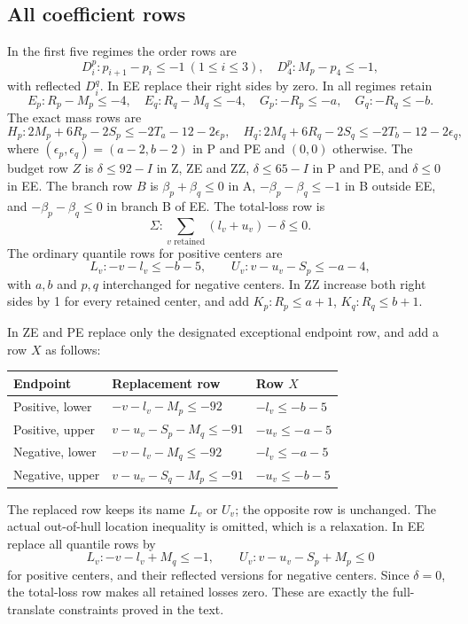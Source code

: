\documentclass[11pt,a4paper]{article}
\theoremstyle{remark}
\begin{document}
\subsection{All coefficient rows}
In the first five regimes the order rows are
\[
 D_i^p:p_{i+1}-p_i\leq-1\ (1\leq i\leq3),\quad
 D_4^p:M_p-p_4\leq-1,
\]
with reflected $D_i^q$. In EE replace their right sides by zero.
In all regimes retain
\[
 E_p:R_p-M_p\leq-4,\quad E_q:R_q-M_q\leq-4,\quad
 G_p:-R_p\leq-a,\quad G_q:-R_q\leq-b.
\]
The exact mass rows are
\[
 H_p:2M_p+6R_p-2S_p\leq-2T_a-12-2\epsilon_p,
 \quad
 H_q:2M_q+6R_q-2S_q\leq-2T_b-12-2\epsilon_q,
\]
where $(\epsilon_p,\epsilon_q)=(a-2,b-2)$ in P and PE and $(0,0)$
otherwise. The budget row $Z$ is $\delta\leq92-I$ in Z, ZE and ZZ,
$\delta\leq65-I$ in P and PE, and $\delta\leq0$ in EE.
The branch row $B$ is $\beta_p+\beta_q\leq0$ in A,
$-\beta_p-\beta_q\leq-1$ in B outside EE, and
$-\beta_p-\beta_q\leq0$ in branch B of EE.
The total-loss row is
\[
 \Sigma:\sum_{v\text{ retained}}(l_v+u_v)-\delta\leq0.
\]
The ordinary quantile rows for positive centers are
\[
 L_v:-v-l_v\leq-b-5,\qquad U_v:v-u_v-S_p\leq-a-4,
\]
with $a,b$ and $p,q$ interchanged for negative centers.
In ZZ increase both right sides by 1 for every retained center, and add
$K_p:R_p\leq a+1$, $K_q:R_q\leq b+1$.

In ZE and PE replace only the designated exceptional endpoint row, and
add a row $X$ as follows:
\begin{center}\small
\begin{tabular}{lll}
\toprule
Endpoint&Replacement row&Row $X$\\
\midrule
Positive, lower&$-v-l_v-M_p\leq-92$&$-l_v\leq-b-5$\\
Positive, upper&$v-u_v-S_p-M_q\leq-91$&$-u_v\leq-a-5$\\
Negative, lower&$-v-l_v-M_q\leq-92$&$-l_v\leq-a-5$\\
Negative, upper&$v-u_v-S_q-M_p\leq-91$&$-u_v\leq-b-5$\\
\bottomrule
\end{tabular}
\end{center}
The replaced row keeps its name $L_v$ or $U_v$; the opposite row is
unchanged. The actual out-of-hull location inequality is omitted, which
is a relaxation. In EE replace all quantile rows by
\[
 L_v:-v-l_v+M_q\leq-1,\qquad
 U_v:v-u_v-S_p+M_p\leq0
\]
for positive centers, and their reflected versions for negative centers.
Since $\delta=0$, the total-loss row makes all retained losses zero.
These are exactly the full-translate constraints proved in the text.
\end{document}
